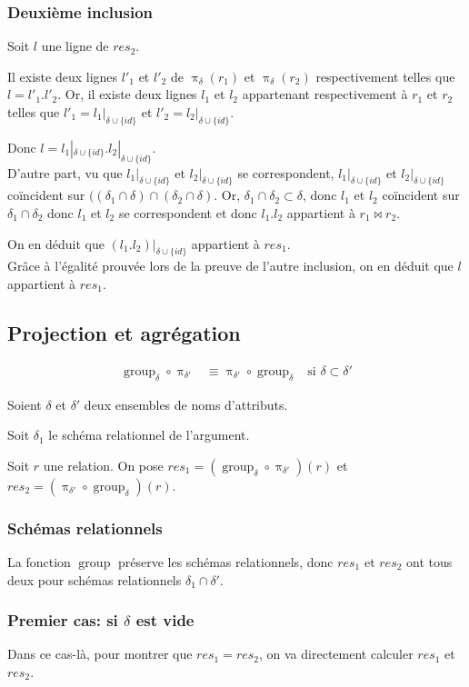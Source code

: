 \documentclass[french]{article}
\DeclareMathOperator{\proj}{\pi}
\DeclareMathOperator{\group}{group}
\newcommand{\projDelta}{\proj_{\delta}}
\newcommand{\groupDelta}{\group_{\delta}}
\newcommand{\cip}{\cup \{id\}}
\newcommand{\dilta}{{\delta \cip}}
\newcommand{\intro}[2]{Soit $r$ une relation. On pose $res_1 = (#1)(r) $ et $res_2 = (#2)(r) $}
\begin{document}
\subsubsection*{Deuxième inclusion}
Soit $l$ une ligne de $res_2$.

Il existe deux lignes $l'_1$ et $l'_2$ de $\projDelta(r_1)$
et $\projDelta(r_2)$ respectivement telles que
$l = l'_1 . l'_2$.
Or, il existe deux lignes $l_1$ et $l_2$ appartenant respectivement
à $r_1$ et $r_2$ telles que 
$l'_1 = l_1 |_\dilta$
et 
$l'_2 = l_2 |_\dilta$.

Donc $l = l_1 |_\dilta . l_2 |_\dilta$. \\

D'autre part,
vu que $l_1|_\dilta$ et $l_2|_\dilta$ se correspondent,
$l_1|_\dilta$ et $l_2|_\dilta$ coïncident sur 
$((\delta_1 \cap \delta) \cap (\delta_2 \cap \delta)$.
Or, $\delta_1 \cap \delta_2 \subset \delta$,
donc $l_1$ et $l_2$ coïncident sur $\delta_1 \cap \delta_2$
donc $l_1$ et $l_2$ se correspondent et donc
$l_1 . l_2$ appartient à $r_1 \Join r_2$.

On en déduit que $\left( l_1 . l_2 \right)|_\dilta$
appartient à $res_1$. \\

Grâce à l'égalité prouvée lors de la preuve de l'autre inclusion,
on en déduit que $l$ appartient à $res_1$.

\subsection*{Projection et agrégation}
\begin{align}
\groupDelta \circ \proj_{\delta'}
& \equiv \proj_{\delta'} \circ \groupDelta
& \text{si $\delta \subset \delta'$}
\end{align}

Soient $\delta$ et $\delta'$ deux ensembles de noms d'attributs.

Soit $\delta_1$ le schéma relationnel de l'argument.

\intro{\groupDelta \circ \proj_{\delta'}}{\proj_{\delta'} \circ \groupDelta}.

\subsubsection*{Schémas relationnels}
La fonction $\group$ préserve les schémas relationnels,
donc $res_1$ et $res_2$ ont tous deux pour schémas relationnels
$\delta_1 \cap \delta'$.

\subsubsection*{Premier cas: si $\delta$ est vide}
Dans ce cas-là, pour montrer que $res_1 = res_2$,
on va directement calculer $res_1$ et $res_2$.
\end{document}
